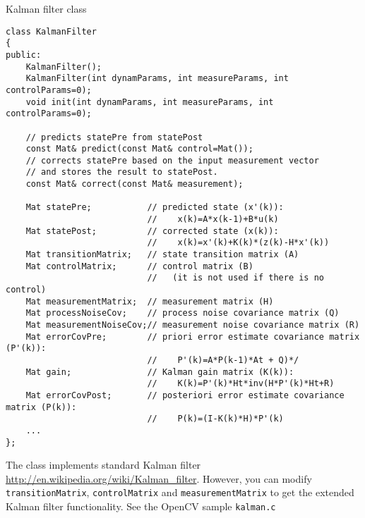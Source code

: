 Kalman filter class

\begin{lstlisting}
class KalmanFilter
{
public:
    KalmanFilter();
    KalmanFilter(int dynamParams, int measureParams, int controlParams=0);
    void init(int dynamParams, int measureParams, int controlParams=0);

    // predicts statePre from statePost
    const Mat& predict(const Mat& control=Mat());
    // corrects statePre based on the input measurement vector
    // and stores the result to statePost. 
    const Mat& correct(const Mat& measurement);

    Mat statePre;           // predicted state (x'(k)):
                            //    x(k)=A*x(k-1)+B*u(k)
    Mat statePost;          // corrected state (x(k)):
                            //    x(k)=x'(k)+K(k)*(z(k)-H*x'(k))
    Mat transitionMatrix;   // state transition matrix (A)
    Mat controlMatrix;      // control matrix (B)
                            //   (it is not used if there is no control)
    Mat measurementMatrix;  // measurement matrix (H)
    Mat processNoiseCov;    // process noise covariance matrix (Q)
    Mat measurementNoiseCov;// measurement noise covariance matrix (R)
    Mat errorCovPre;        // priori error estimate covariance matrix (P'(k)):
                            //    P'(k)=A*P(k-1)*At + Q)*/
    Mat gain;               // Kalman gain matrix (K(k)):
                            //    K(k)=P'(k)*Ht*inv(H*P'(k)*Ht+R)
    Mat errorCovPost;       // posteriori error estimate covariance matrix (P(k)):
                            //    P(k)=(I-K(k)*H)*P'(k)
    ...
};
\end{lstlisting}

The class implements standard Kalman filter \url{http://en.wikipedia.org/wiki/Kalman_filter}. However, you can modify \texttt{transitionMatrix}, \texttt{controlMatrix} and \texttt{measurementMatrix} to get the extended Kalman filter functionality. See the OpenCV sample \texttt{kalman.c}

\fi
